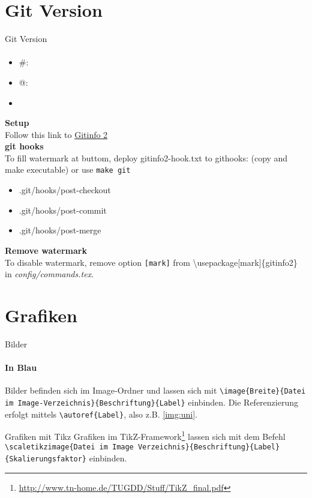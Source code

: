 \documentclass[10pt,aspectratio=\ratio,
compress
]{beamer}
\begin{document}
\section{Git Version}
\begin{frame}{Git Version}\framesubtitle{\gitAbbrevHash}
\begin{itemize}
\item \#: \gitAbbrevHash
\item @: \gitAuthorIsoDate
\item \gitReferences
\end{itemize}
\textbf{Setup}\\
Follow this link to \href{https://www.ctan.org/tex-archive/macros/latex/contrib/gitinfo2}{Gitinfo 2}\\
\textbf{git hooks}\\
  To fill watermark at buttom, deploy gitinfo2-hook.txt to githooks: (copy and make executable) or use \texttt{make git}
  \begin{itemize}
      \item .git/hooks/post-checkout
      \item .git/hooks/post-commit
      \item .git/hooks/post-merge
  \end{itemize}
  \textbf{Remove watermark}\\
  To disable watermark, remove option \texttt{[mark]} from \textbackslash usepackage[mark]\{gitinfo2\} in \textit{config/commands.tex}.
\end{frame}

\section{Grafiken}
\begin{frame}[containsverbatim]{Bilder}
\framesubtitle{In Blau}
Bilder befinden sich im Image-Ordner und lassen sich mit \lstinline|\image{Breite}{Datei im Image-Verzeichnis}{Beschriftung}{Label}| einbinden.
Die Referenzierung erfolgt mittels \lstinline|\autoref{Label}|, also z.B. \autoref{img:uni}.
\end{frame}

\begin{frame}[containsverbatim]{Grafiken mit Tikz}
Grafiken im TikZ-Framework\footnote{\url{http://www.tn-home.de/TUGDD/Stuff/TikZ_final.pdf}} lassen sich mit dem Befehl \lstinline|\scaletikzimage{Datei im Image Verzeichnis}{Beschriftung}{Label}{Skalierungsfaktor}| einbinden. 
\end{frame}
\end{document}
